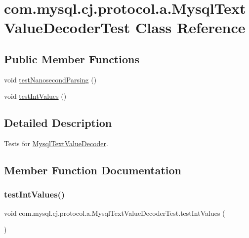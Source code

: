 \hypertarget{classcom_1_1mysql_1_1cj_1_1protocol_1_1a_1_1_mysql_text_value_decoder_test}{}\section{com.\+mysql.\+cj.\+protocol.\+a.\+Mysql\+Text\+Value\+Decoder\+Test Class Reference}
\label{classcom_1_1mysql_1_1cj_1_1protocol_1_1a_1_1_mysql_text_value_decoder_test}
\subsection*{Public Member Functions}
\begin{DoxyCompactItemize}
\item 
void \mbox{\hyperlink{classcom_1_1mysql_1_1cj_1_1protocol_1_1a_1_1_mysql_text_value_decoder_test_a7df8b20eb57045aee4e632d53302fe6a}{test\+Nanosecond\+Parsing}} ()
\item 
void \mbox{\hyperlink{classcom_1_1mysql_1_1cj_1_1protocol_1_1a_1_1_mysql_text_value_decoder_test_a6269c60ceb2adcaf8ac7d887853f11e2}{test\+Int\+Values}} ()
\end{DoxyCompactItemize}


\subsection{Detailed Description}
Tests for \mbox{\hyperlink{classcom_1_1mysql_1_1cj_1_1protocol_1_1a_1_1_mysql_text_value_decoder}{Mysql\+Text\+Value\+Decoder}}. 

\subsection{Member Function Documentation}
\mbox{\label{classcom_1_1mysql_1_1cj_1_1protocol_1_1a_1_1_mysql_text_value_decoder_test_a6269c60ceb2adcaf8ac7d887853f11e2}} 
\subsubsection{\texorpdfstring{test\+Int\+Values()}{testIntValues()}}
{\footnotesize\ttfamily void com.\+mysql.\+cj.\+protocol.\+a.\+Mysql\+Text\+Value\+Decoder\+Test.\+test\+Int\+Values (\begin{DoxyParamCaption}{ }\end{DoxyParamCaption})}

